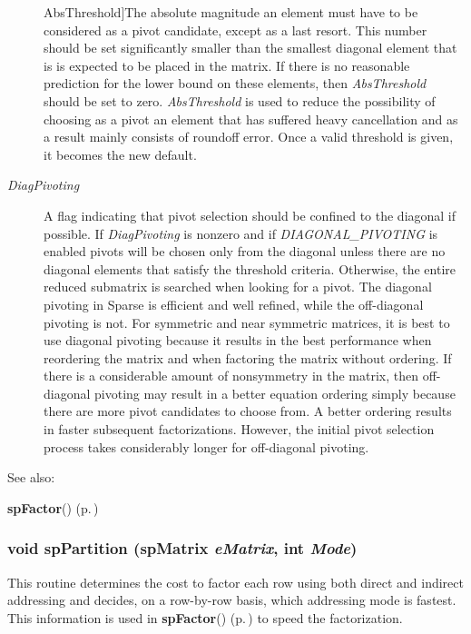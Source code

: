 \begin{Desc}
\begin{description}
{Abs\-Threshold}]The absolute magnitude an element must have to be considered as a pivot candidate, except as a last resort. This number should be set significantly smaller than the smallest diagonal element that is is expected to be placed in the matrix. If there is no reasonable prediction for the lower bound on these elements, then {\em Abs\-Threshold} should be set to zero. {\em Abs\-Threshold} is used to reduce the possibility of choosing as a pivot an element that has suffered heavy cancellation and as a result mainly consists of roundoff error. Once a valid threshold is given, it becomes the new default. \item[{\em 
Diag\-Pivoting}]A flag indicating that pivot selection should be confined to the diagonal if possible. If {\em Diag\-Pivoting} is nonzero and if {\em DIAGONAL\_\-PIVOTING} is enabled pivots will be chosen only from the diagonal unless there are no diagonal elements that satisfy the threshold criteria. Otherwise, the entire reduced submatrix is searched when looking for a pivot. The diagonal pivoting in Sparse is efficient and well refined, while the off-diagonal pivoting is not. For symmetric and near symmetric matrices, it is best to use diagonal pivoting because it results in the best performance when reordering the matrix and when factoring the matrix without ordering. If there is a considerable amount of nonsymmetry in the matrix, then off-diagonal pivoting may result in a better equation ordering simply because there are more pivot candidates to choose from. A better ordering results in faster subsequent factorizations. However, the initial pivot selection process takes considerably longer for off-diagonal pivoting.\end{description}
\end{Desc}
\begin{Desc}
\item[See also: ]\par
{\bf sp\-Factor}() {\rm (p.\,\pageref{spFactor_8c_a25})} \end{Desc}
\subsubsection{\setlength{\rightskip}{0pt plus 5cm}void sp\-Partition ({\bf sp\-Matrix} {\em e\-Matrix}, int {\em Mode})}\label{spFactor_8c_a26}


This routine determines the cost to factor each row using both direct and indirect addressing and decides, on a row-by-row basis, which addressing mode is fastest. This information is used in {\bf sp\-Factor}() {\rm (p.\,\pageref{spFactor_8c_a25})} to speed the factorization.

